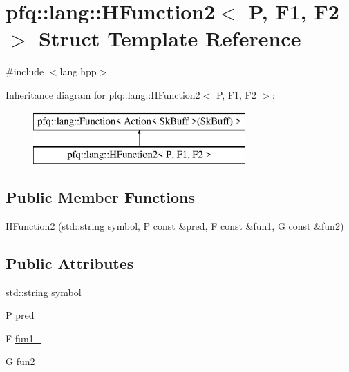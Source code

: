 \hypertarget{structpfq_1_1lang_1_1HFunction2}{\section{pfq\+:\+:lang\+:\+:H\+Function2$<$ P, F1, F2 $>$ Struct Template Reference}
\label{structpfq_1_1lang_1_1HFunction2}
}


{\ttfamily \#include $<$lang.\+hpp$>$}

Inheritance diagram for pfq\+:\+:lang\+:\+:H\+Function2$<$ P, F1, F2 $>$\+:\begin{figure}[H]
\begin{center}
\leavevmode
\includegraphics[height=2.000000cm]{structpfq_1_1lang_1_1HFunction2}
\end{center}
\end{figure}
\subsection*{Public Member Functions}
\begin{DoxyCompactItemize}
\item 
\hyperlink{structpfq_1_1lang_1_1HFunction2_ad1b6b69cb20f56e80c106c07137bb0c7}{H\+Function2} (std\+::string symbol, P const \&pred, F const \&fun1, G const \&fun2)
\end{DoxyCompactItemize}
\subsection*{Public Attributes}
\begin{DoxyCompactItemize}
\item 
std\+::string \hyperlink{structpfq_1_1lang_1_1HFunction2_af2fa3e1a43ae06688d7160598e934d23}{symbol\+\_\+}
\item 
P \hyperlink{structpfq_1_1lang_1_1HFunction2_ab87deff7c26d758a0627ad95c39e37db}{pred\+\_\+}
\item 
F \hyperlink{structpfq_1_1lang_1_1HFunction2_a709d27ce625bd8f10297e24bea516e62}{fun1\+\_\+}
\item 
G \hyperlink{structpfq_1_1lang_1_1HFunction2_a0f5b702e6d51503fa06e51ea7048b754}{fun2\+\_\+}
\end{DoxyCompactItemize}

